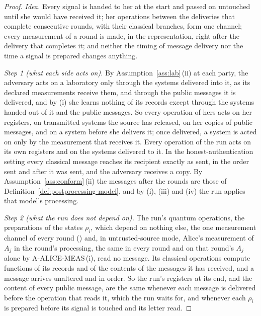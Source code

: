 \begin{proof}
\emph{Idea.} Every signal is handed to her at the start and passed on
untouched until she would have received it; her operations between the
deliveries that complete consecutive rounds, with their classical branches,
form one channel; every measurement of a round is made, in the
representation, right after the delivery that completes it; and neither the timing of message
delivery nor the time a signal is prepared changes anything.

\emph{Step 1 (what each side acts on).} By Assumption~\ref{ass:lab}\,(ii) at
each party, the adversary acts on a laboratory only through the systems
delivered into it, as its declared measurements receive them, and through the
public messages it is delivered, and by (i) she learns nothing of its records
except through the systems handed out of it and the public messages. So every
operation of hers acts on her registers, on transmitted systems the source has
released, on her copies of public messages, and on a system before she
delivers it; once delivered, a system is acted on only by the measurement
that receives it. Every operation of the run acts on its own registers and on
the systems delivered to it. In the honest-authentication setting every
classical message reaches its recipient exactly as sent, in the order sent and
after it was sent, and the adversary receives a copy. By
Assumption~\ref{ass:conform}\,(ii) the messages after the rounds are those of
Definition~\ref{def:postprocessing-model}, and by (i), (iii) and (iv) the run
applies that model's processing.

\emph{Step 2 (what the run does not depend on).} The run's quantum
operations, the preparations of the states $\rho_i$, which depend on nothing
else, the one measurement channel of every round
() and, in untrusted-source mode, Alice's
measurement of $A_j$ in the round's processing, the same in every round and
on that round's $A_j$ alone by A-ALICE-MEAS\,(i), read no message. Its classical operations
compute functions of its records and of the contents of the messages it has
received, and a message arrives unaltered and in order. So the run's
registers at its end, and the content of every public message, are the same
whenever each message is delivered before the operation that reads it, which
the run waits for, and whenever each $\rho_i$ is prepared before its signal
is touched and its letter read.


\end{proof}
